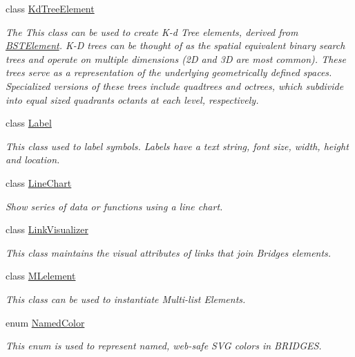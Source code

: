 \begin{DoxyCompactItemize}
class \hyperlink{classbridges_1_1base_1_1_kd_tree_element}{Kd\+Tree\+Element}
\begin{DoxyCompactList}\small\item\em The This class can be used to create K-\/d Tree elements, derived from \hyperlink{classbridges_1_1base_1_1_b_s_t_element}{B\+S\+T\+Element}. K-\/D trees can be thought of as the spatial equivalent binary search trees and operate on multiple dimensions (2D and 3D are most common). These trees serve as a representation of the underlying geometrically defined spaces. Specialized versions of these trees include quadtrees and octrees, which subdivide into equal sized quadrants octants at each level, respectively. \end{DoxyCompactList}\item 
class \hyperlink{classbridges_1_1base_1_1_label}{Label}
\begin{DoxyCompactList}\small\item\em This class used to label symbols. Labels have a text string, font size, width, height and location. \end{DoxyCompactList}\item 
class \hyperlink{classbridges_1_1base_1_1_line_chart}{Line\+Chart}
\begin{DoxyCompactList}\small\item\em Show series of data or functions using a line chart. \end{DoxyCompactList}\item 
class \hyperlink{classbridges_1_1base_1_1_link_visualizer}{Link\+Visualizer}
\begin{DoxyCompactList}\small\item\em This class maintains the visual attributes of links that join Bridges elements. \end{DoxyCompactList}\item 
class \hyperlink{classbridges_1_1base_1_1_m_lelement}{M\+Lelement}
\begin{DoxyCompactList}\small\item\em This class can be used to instantiate Multi-\/list Elements. \end{DoxyCompactList}\item 
enum \hyperlink{enumbridges_1_1base_1_1_named_color}{Named\+Color}
\begin{DoxyCompactList}\small\item\em This enum is used to represent named, web-\/safe S\+VG colors in B\+R\+I\+D\+G\+ES. \end{DoxyCompactList}\item 

\end{DoxyCompactItemize}
